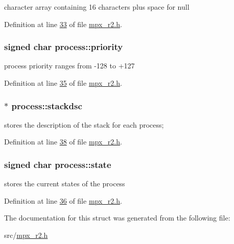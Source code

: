 character array containing 16 characters plus space for null 



Definition at line \hyperlink{mpx__r2_8h_source_l00033}{33} of file \hyperlink{mpx__r2_8h_source}{mpx\_\-r2.h}.

\hypertarget{structprocess_a788405fd9aeccd863516f34d3ce1c41e}{
\subsubsection[{priority}]{\setlength{\rightskip}{0pt plus 5cm}signed char {\bf process::priority}}}
\label{structprocess_a788405fd9aeccd863516f34d3ce1c41e}


process priority ranges from -\/128 to +127 



Definition at line \hyperlink{mpx__r2_8h_source_l00035}{35} of file \hyperlink{mpx__r2_8h_source}{mpx\_\-r2.h}.

\hypertarget{structprocess_a7e0fb37fbb9c155b18f75a94a8fc202b}{
\subsubsection[{stackdsc}]{$\ast$ {\bf process::stackdsc}}}
\label{structprocess_a7e0fb37fbb9c155b18f75a94a8fc202b}


stores the description of the stack for each process; 



Definition at line \hyperlink{mpx__r2_8h_source_l00038}{38} of file \hyperlink{mpx__r2_8h_source}{mpx\_\-r2.h}.

\hypertarget{structprocess_af8bb04355feac474fa959e3db52618c9}{
\subsubsection[{state}]{\setlength{\rightskip}{0pt plus 5cm}signed char {\bf process::state}}}
\label{structprocess_af8bb04355feac474fa959e3db52618c9}


stores the current states of the process 



Definition at line \hyperlink{mpx__r2_8h_source_l00036}{36} of file \hyperlink{mpx__r2_8h_source}{mpx\_\-r2.h}.



The documentation for this struct was generated from the following file:\begin{DoxyCompactItemize}
\item 
src/\hyperlink{mpx__r2_8h}{mpx\_\-r2.h}\end{DoxyCompactItemize}
